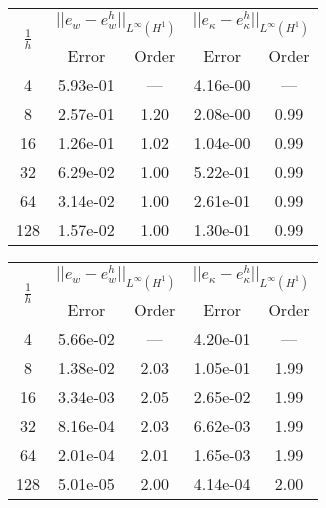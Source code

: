 \begin{table}[hp]
	\centering
	\begin{tabular}{ccccc}
		\hline 
		\multirow{2}{*}{$\frac{1}{h}$} & \multicolumn{2}{c}{$||e_w - e_w^h||_{L^{\infty}(H^1)}$}  & \multicolumn{2}{c}{$||e_\kappa - e_\kappa^h||_{L^{\infty}(H^1)}$}   \\ 
		& Error & Order  & Error & Order  \\
		\hline 
		4  & 5.93e-01 & ---  & 4.16e-00 & ---  \\ 
		8  & 2.57e-01 & 1.20 & 2.08e-00 & 0.99 \\ 
		16 & 1.26e-01 & 1.02 & 1.04e-00 & 0.99 \\ 
		32 & 6.29e-02 & 1.00 & 5.22e-01 & 0.99 \\ 
		64 & 3.14e-02 & 1.00 & 2.61e-01 & 0.99 \\ 
		128& 1.57e-02 & 1.00 & 1.30e-01 & 0.99 \\
		\hline 
	\end{tabular} 
	\captionsetup{width=0.95\linewidth}
	\vspace{1mm}
	\label{tab:resebCGCG_k1}
\end{table}	

\begin{table}[hp]
	\centering
	\begin{tabular}{ccccc}
		\hline 
		\multirow{2}{*}{$\frac{1}{h}$} & \multicolumn{2}{c}{$||e_w - e_w^h||_{L^{\infty}(H^1)}$}  & \multicolumn{2}{c}{$||e_\kappa - e_\kappa^h||_{L^{\infty}(H^1)}$}   \\ 
		& Error & Order  & Error & Order  \\
		\hline 
		4  & 5.66e-02 & ---  & 4.20e-01 & ---  \\ 
		8  & 1.38e-02 & 2.03 & 1.05e-01 & 1.99 \\ 
		16 & 3.34e-03 & 2.05 & 2.65e-02 & 1.99 \\ 
		32 & 8.16e-04 & 2.03 & 6.62e-03 & 1.99 \\ 
		64 & 2.01e-04 & 2.01 & 1.65e-03 & 1.99 \\ 
		128& 5.01e-05 & 2.00 & 4.14e-04 & 2.00 \\
		\hline 
	\end{tabular} 
	\captionsetup{width=0.95\linewidth}
	\vspace{1mm}
	\label{tab:resebCGCG_k2}
\end{table}	

